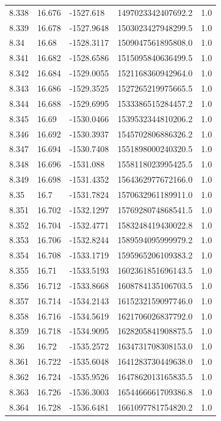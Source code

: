 \begin{tabular}{lllll}
8.338 & 16.676 & -1527.618 & 1497023342407692.2 & 1.0 \\
8.339 & 16.678 & -1527.9648 & 1503023427948299.5 & 1.0 \\
8.34 & 16.68 & -1528.3117 & 1509047561895808.0 & 1.0 \\
8.341 & 16.682 & -1528.6586 & 1515095840636499.5 & 1.0 \\
8.342 & 16.684 & -1529.0055 & 1521168360942964.0 & 1.0 \\
8.343 & 16.686 & -1529.3525 & 1527265219975665.5 & 1.0 \\
8.344 & 16.688 & -1529.6995 & 1533386515284457.2 & 1.0 \\
8.345 & 16.69 & -1530.0466 & 1539532344810206.2 & 1.0 \\
8.346 & 16.692 & -1530.3937 & 1545702806886326.2 & 1.0 \\
8.347 & 16.694 & -1530.7408 & 1551898000240320.5 & 1.0 \\
8.348 & 16.696 & -1531.088 & 1558118023995425.5 & 1.0 \\
8.349 & 16.698 & -1531.4352 & 1564362977672166.0 & 1.0 \\
8.35 & 16.7 & -1531.7824 & 1570632961189911.0 & 1.0 \\
8.351 & 16.702 & -1532.1297 & 1576928074868541.5 & 1.0 \\
8.352 & 16.704 & -1532.4771 & 1583248419430022.8 & 1.0 \\
8.353 & 16.706 & -1532.8244 & 1589594095999979.2 & 1.0 \\
8.354 & 16.708 & -1533.1719 & 1595965206109383.2 & 1.0 \\
8.355 & 16.71 & -1533.5193 & 1602361851696143.5 & 1.0 \\
8.356 & 16.712 & -1533.8668 & 1608784135106703.5 & 1.0 \\
8.357 & 16.714 & -1534.2143 & 1615232159097746.0 & 1.0 \\
8.358 & 16.716 & -1534.5619 & 1621706026837792.0 & 1.0 \\
8.359 & 16.718 & -1534.9095 & 1628205841908875.5 & 1.0 \\
8.36 & 16.72 & -1535.2572 & 1634731708308153.0 & 1.0 \\
8.361 & 16.722 & -1535.6048 & 1641283730449638.0 & 1.0 \\
8.362 & 16.724 & -1535.9526 & 1647862013165835.5 & 1.0 \\
8.363 & 16.726 & -1536.3003 & 1654466661709386.8 & 1.0 \\
8.364 & 16.728 & -1536.6481 & 1661097781754820.2 & 1.0 \\

\end{tabular}
